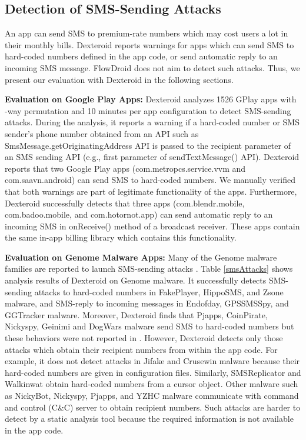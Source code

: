 \documentclass[10pt]{elsarticle}
\begin{document}
\subsection{Detection of SMS-Sending Attacks} 

An app can send SMS to premium-rate numbers which may cost users a lot in their monthly bills. Dexteroid reports warnings for apps which can send SMS to hard-coded numbers defined in the app code, or send automatic reply to an incoming SMS message. FlowDroid does not aim to detect such attacks. Thus, we present our evaluation with Dexteroid in the following sections.  


{\noindent \bf Evaluation on Google Play Apps:} Dexteroid analyzes 1526 GPlay apps with -way permutation and 10 minutes per app configuration to detect SMS-sending attacks. During the analysis, it reports a warning if a hard-coded number or SMS sender's phone number obtained from an API such as {\ttfamily SmsMessage.getOriginatingAddress} API is passed to the recipient parameter of an SMS sending API (e.g., first parameter of {\ttfamily sendTextMessage()} API). Dexteroid reports that two Google Play apps ({\ttfamily com.metropcs.service.vvm} and {\ttfamily com.saavn.android}) can send SMS to hard-coded numbers. We manually verified that both warnings are part of legitimate functionality of the apps. Furthermore, Dexteroid successfully detects that three apps ({\ttfamily com.blendr.mobile}, {\ttfamily com.badoo.mobile}, and {\ttfamily com.hotornot.app}) can send automatic reply to an incoming SMS in {\ttfamily onReceive()} method of a broadcast receiver. These apps contain the same in-app billing library which contains this functionality.


{\noindent \bf Evaluation on Genome Malware Apps:} Many of the Genome malware families are reported to launch SMS-sending attacks \cite{dissectingAndroid}. Table \ref{smsAttacks} shows analysis results of Dexteroid on Genome malware. It successfully detects SMS-sending attacks to hard-coded numbers in FakePlayer, HippoSMS, and Zsone malware, and SMS-reply to incoming messages in Endofday, GPSSMSSpy, and GGTracker malware. Moreover, Dexteroid finds that Pjapps, CoinPirate, Nickyspy, Geinimi and DogWars malware send SMS to hard-coded numbers but these behaviors were not reported in \cite{dissectingAndroid}. However, Dexteroid detects only those attacks which obtain their recipient numbers from within the app code. For example, it does not detect attacks in Jifake and Crusewin malware because their hard-coded numbers are given in configuration files. Similarly, SMSReplicator and Walkinwat obtain hard-coded numbers from a {\ttfamily cursor} object. Other malware such as NickyBot, Nickyspy, Pjapps, and YZHC malware communicate with command and control (C\&C) server to obtain recipient numbers. Such attacks are harder to detect by a static analysis tool because the required information is not available in the app code.
\end{document}

